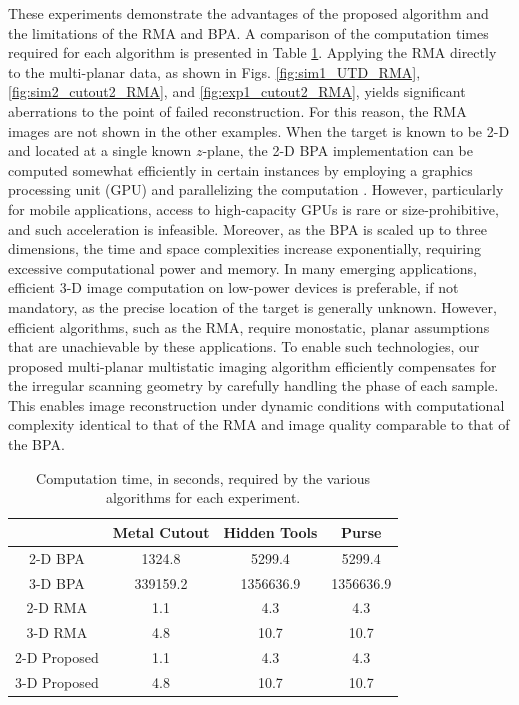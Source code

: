 \documentclass{ieeeaccess}
\begin{document}
These experiments demonstrate the advantages of the proposed algorithm and the limitations of the RMA and BPA.
A comparison of the computation times required for each algorithm is presented in Table \ref{tab:computation_times}.
Applying the RMA directly to the multi-planar data, as shown in Figs. \ref{fig:sim1_UTD_RMA}, \ref{fig:sim2_cutout2_RMA}, and \ref{fig:exp1_cutout2_RMA}, yields significant aberrations to the point of failed reconstruction. 
For this reason, the RMA images are not shown in the other examples. 
When the target is known to be \mbox{2-D} and located at a single known $z$-plane, the 2-D BPA implementation can be computed somewhat efficiently in certain instances by employing a graphics processing unit (GPU) and parallelizing the computation \cite{alvarez2019freehand,alvarez2021freehand,alvarez2021system,alvarez2021freehandsystem,alvarez2021towards}.
However, particularly for mobile applications, access to high-capacity GPUs is rare or size-prohibitive, and such acceleration is infeasible.
Moreover, as the BPA is scaled up to three dimensions, the time and space complexities increase exponentially, requiring excessive computational power and memory.
In many emerging applications, efficient \mbox{3-D} image computation on low-power devices is preferable, if not mandatory, as the precise location of the target is generally unknown.
However, efficient algorithms, such as the RMA, require monostatic, planar assumptions that are unachievable by these applications. 
To enable such technologies, our proposed multi-planar multistatic imaging algorithm efficiently compensates for the irregular scanning geometry by carefully handling the phase of each sample.
This enables image reconstruction under dynamic conditions with computational complexity identical to that of the RMA and image quality comparable to that of the BPA.

\begin{table}[h]
    \centering
    \begin{tabular}{c | c | c | c }
         & Metal Cutout & Hidden Tools & Purse \\
         \hline
         \hline
         \mbox{2-D} BPA & 1324.8 & 5299.4 & 5299.4 \\
         \mbox{3-D} BPA & 339159.2 & 1356636.9 & 1356636.9 \\
         \hline
         \mbox{2-D} RMA & 1.1 & 4.3 & 4.3 \\
         \mbox{3-D} RMA & 4.8 & 10.7 & 10.7 \\
         \hline
         \mbox{2-D} Proposed & 1.1 & 4.3 & 4.3 \\
         \mbox{3-D} Proposed & 4.8 & 10.7 & 10.7 \\
         \hline
         \hline
    \end{tabular}
    \caption{Computation time, in seconds, required by the various algorithms for each experiment.}
    \label{tab:computation_times}
\end{table}
\end{document}
